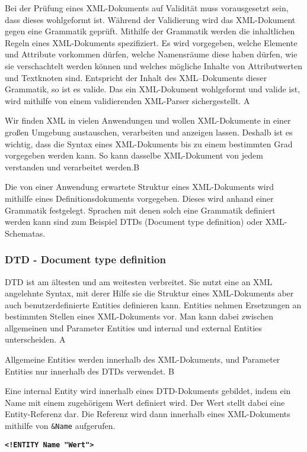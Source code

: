 Bei der Prüfung eines XML-Dokuments auf Validität muss vorausgesetzt sein, dass dieses wohlgeformt ist. Während der Validierung wird das XML-Dokument gegen eine Grammatik geprüft. Mithilfe der Grammatik werden die inhaltlichen Regeln eines XML-Dokuments spezifiziert. Es wird vorgegeben, welche Elemente und Attribute vorkommen dürfen, welche Namensräume diese haben dürfen, wie sie verschachtelt werden können und welches mögliche Inhalte von Attributwerten und Textknoten sind. Entspricht der Inhalt des XML–Dokuments dieser Grammatik, so ist es valide. Das ein XML-Dokument wohlgeformt und valide ist, wird mithilfe von einem validierenden XML-Parser sichergestellt. A

Wir finden XML in vielen Anwendungen und wollen XML-Dokumente in einer großen Umgebung austauschen, verarbeiten und anzeigen lassen. Deshalb ist es wichtig, dass die Syntax eines XML-Dokuments bis zu einem bestimmten Grad vorgegeben werden kann. So kann dasselbe XML-Dokument von jedem verstanden und verarbeitet werden.B 

Die von einer Anwendung erwartete Struktur eines XML-Dokuments wird mithilfe eines Definitionsdokuments vorgegeben. Dieses wird anhand einer Grammatik festgelegt. Sprachen mit denen solch eine Grammatik definiert werden kann sind zum Beispiel DTDs (Document type definition) oder XML-Schematas.

\subsubsection{DTD - Document type definition}

DTD ist am ältesten und am weitesten verbreitet.  Sie nutzt eine an XML angelehnte Syntax, mit derer Hilfe sie die Struktur eines XML-Dokuments aber auch benutzerdefinierte Entities definieren kann. Entities nehmen Ersetzungen an bestimmten Stellen eines XML-Dokuments vor. Man kann dabei zwischen allgemeinen und Parameter Entities und internal und external Entities unterscheiden. A

Allgemeine Entities werden innerhalb des XML-Dokuments, und Parameter Entities nur innerhalb des DTDs verwendet. B

Eine internal Entity wird innerhalb eines DTD-Dokuments gebildet, indem ein Name mit einem zugehörigem Wert definiert wird. Der Wert stellt dabei eine Entity-Referenz dar. Die Referenz wird dann innerhalb eines XML-Dokuments mithilfe von \texttt{\&Name} aufgerufen.

\tabto{1.5cm}\texttt{\textbf{<!ENTITY Name "{}Wert"{}>}}


